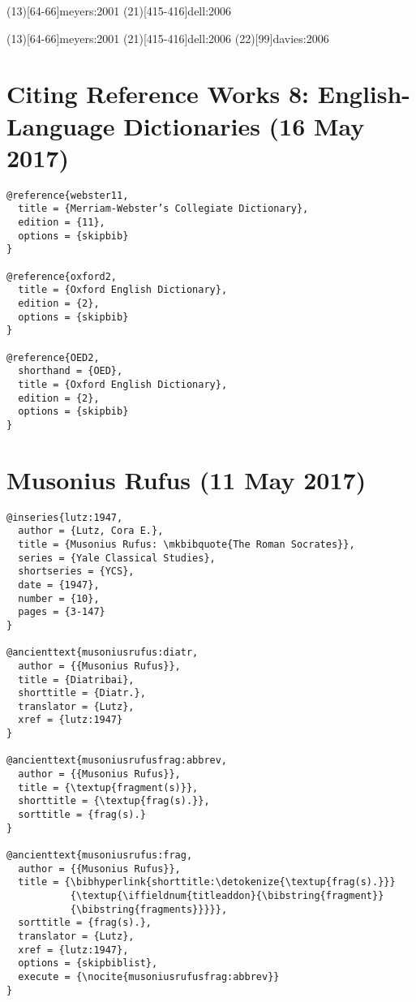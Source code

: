 \documentclass[a4paper]{article}
\begin{document}
\examplecite(13)[64-66]{meyers:2001}
\examplecite(21)[415-416]{dell:2006}
\citereset
\begin{verbtext}
  \usepackage[style=sbl,citepages=separate]{biblatex}
\end{verbtext}
\makeatletter
{\cbx@opt@citepages@separate
 \examplecite(13)[64-66]{meyers:2001}
}
\makeatother
\examplecite(21)[415-416]{dell:2006}
\examplecite(22)[99]{davies:2006}
\examplebibliography
{}

\section{Citing Reference Works 8: English-Language Dictionaries (16 May 2017)}

\begin{verbatim}
@reference{webster11,
  title = {Merriam-Webster’s Collegiate Dictionary},
  edition = {11},
  options = {skipbib}
}

@reference{oxford2,
  title = {Oxford English Dictionary},
  edition = {2},
  options = {skipbib}
}

@reference{OED2,
  shorthand = {OED},
  title = {Oxford English Dictionary},
  edition = {2},
  options = {skipbib}
}
\end{verbatim}

\exampleabbreviations
{}

\section{Musonius Rufus (11 May 2017)}

\begin{verbatim}
@inseries{lutz:1947,
  author = {Lutz, Cora E.},
  title = {Musonius Rufus: \mkbibquote{The Roman Socrates}},
  series = {Yale Classical Studies},
  shortseries = {YCS},
  date = {1947},
  number = {10},
  pages = {3-147}
}

@ancienttext{musoniusrufus:diatr,
  author = {{Musonius Rufus}},
  title = {Diatribai},
  shorttitle = {Diatr.},
  translator = {Lutz},
  xref = {lutz:1947}
}

@ancienttext{musoniusrufusfrag:abbrev,
  author = {{Musonius Rufus}},
  title = {\textup{fragment(s)}},
  shorttitle = {\textup{frag(s).}},
  sorttitle = {frag(s).}
}

@ancienttext{musoniusrufus:frag,
  author = {{Musonius Rufus}},
  title = {\bibhyperlink{shorttitle:\detokenize{\textup{frag(s).}}}
           {\textup{\iffieldnum{titleaddon}{\bibstring{fragment}}
           {\bibstring{fragments}}}}},
  sorttitle = {frag(s).},
  translator = {Lutz},
  xref = {lutz:1947},
  options = {skipbiblist},
  execute = {\nocite{musoniusrufusfrag:abbrev}}
}
\end{verbatim}
\end{document}
